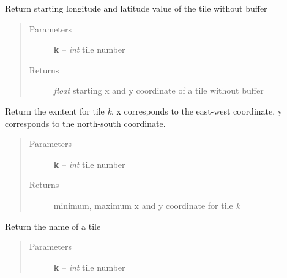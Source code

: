 \documentclass[letterpaper,10pt,english]{sphinxmanual}
\begin{document}
\begin{fulllineitems}

\begin{fulllineitems}
\label{docs/all_multipliers:all_multipliers.TileGrid.get_startcord}
Return starting longitude and latitude value of the tile without buffer
\begin{quote}\begin{description}
\item[{Parameters}] \leavevmode
\textbf{k} -- \emph{int} tile number

\item[{Returns}] \leavevmode
\emph{float} starting x and y coordinate of a tile without buffer

\end{description}\end{quote}

\end{fulllineitems}



\begin{fulllineitems}
\label{docs/all_multipliers:all_multipliers.TileGrid.get_tile_extent_buffer}
Return the exntent for tile \emph{k}. x corresponds to the
east-west coordinate, y corresponds to the north-south
coordinate.
\begin{quote}\begin{description}
\item[{Parameters}] \leavevmode
\textbf{k} -- \emph{int} tile number

\item[{Returns}] \leavevmode
minimum, maximum x and y coordinate for tile \emph{k}

\end{description}\end{quote}

\end{fulllineitems}



\begin{fulllineitems}
\label{docs/all_multipliers:all_multipliers.TileGrid.get_tilename}
Return the name of a tile
\begin{quote}\begin{description}
\item[{Parameters}] \leavevmode
\textbf{k} -- \emph{int} tile number


\end{description}
\end{quote}
\end{fulllineitems}
\end{fulllineitems}
\end{document}
